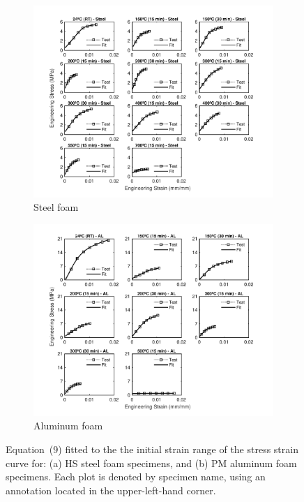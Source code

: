 \documentclass[review]{elsarticle}
\begin{document}
\begin{figure}
	\centering
	\begin{subfigure}{1.00\textwidth}
		\centering
		\includegraphics[width=0.90\linewidth]
		{Tex-Figures/Fig16a-quasi-Elastic-fit-Fe.pdf}
		\caption{Steel foam}
		\label{fig:qElas_Rich_Steel}
	\end{subfigure}

	\par\bigskip %

	\begin{subfigure}{1.00\textwidth}
		\centering
		\includegraphics[width=0.70\linewidth]
		{Tex-Figures/Fig16b-quasi-Elastic-fit-Al.pdf}
		\caption{Aluminum foam}
		\label{fig:qElas_Rich_Al}
	\end{subfigure}
	\caption{Equation~(9) fitted to the the initial strain range of the stress strain curve for: (a) HS steel foam specimens, and (b) PM aluminum foam specimens. Each plot is denoted by specimen name, using an annotation located in the upper-left-hand corner.}
	\label{fig:Stress_strain_elast_fit}
\end{figure}
\end{document}
